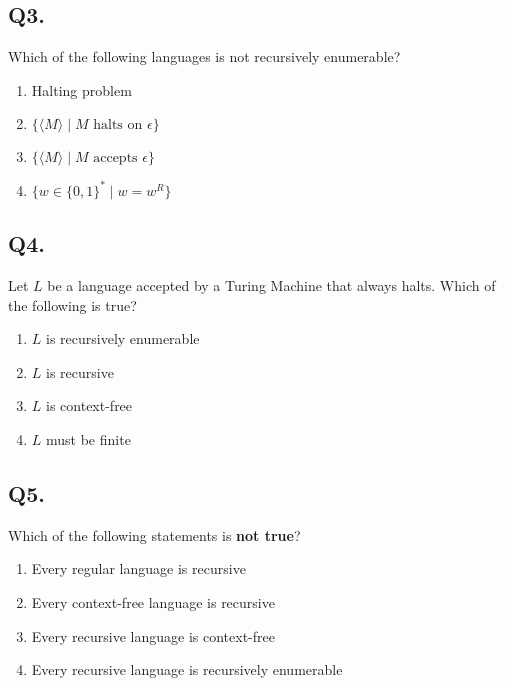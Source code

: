 \vspace{1em}

\subsection*{Q3.}
Which of the following languages is not recursively enumerable?

\begin{enumerate}[label=(\alph*)]
    \item Halting problem  
    \item $\{ \langle M \rangle \mid M \text{ halts on } \epsilon \}$  
    \item $\{ \langle M \rangle \mid M \text{ accepts } \epsilon \}$  
    \item $\{ w \in \{0,1\}^* \mid w = w^R \}$  
\end{enumerate}

\vspace{1em}

\subsection*{Q4.}
Let $L$ be a language accepted by a Turing Machine that always halts. Which of the following is true?

\begin{enumerate}[label=(\alph*)]
    \item $L$ is recursively enumerable  
    \item $L$ is recursive  
    \item $L$ is context-free  
    \item $L$ must be finite  
\end{enumerate}

\vspace{1em}

\subsection*{Q5.}
Which of the following statements is \textbf{not true}?

\begin{enumerate}[label=(\alph*)]
    \item Every regular language is recursive  
    \item Every context-free language is recursive  
    \item Every recursive language is context-free  
    \item Every recursive language is recursively enumerable  
\end{enumerate}
